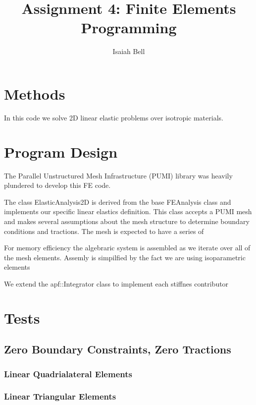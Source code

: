 \documentclass{article}
\begin{document}
\title{Assignment 4: Finite Elements Programming}
\author{Isaiah Bell} 
\maketitle

\section{Methods}

In this code we solve 2D linear elastic problems over isotropic materials.


\section{Program Design}

The Parallel Unstructured Mesh Infrastructure (PUMI) library was heavily plundered to develop this FE code.

The class ElasticAnalysis2D is derived from the base FEAnalysis class and implements
our specific linear elastics definition. This class accepts a PUMI mesh and makes
several assumptions about the mesh structure to determine boundary conditions and
tractions. The mesh is expected to have a series of  

For memory efficiency the algebraric system is assembled as we iterate over all of the
mesh elements. Assemly is simpilfied by the fact we are using isoparametric elements

We extend the apf::Integrator class to implement each stiffnes contributor


\section{Tests}

\subsection{Zero Boundary Constraints, Zero Tractions}
    \subsubsection{Linear Quadrialateral Elements}

    \subsubsection{Linear Triangular Elements}
\end{document}

